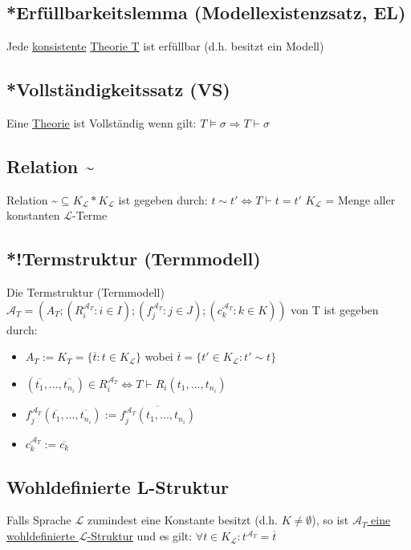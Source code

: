 \documentclass[12pt,a4paper]{article} %
\begin{document}
	\subsection{*Erfüllbarkeitslemma (Modellexistenzsatz, EL)}
	Jede \hyperref[PLKonsistent]{konsistente} \hyperref[Theorie]{Theorie T} ist erfüllbar (d.h. besitzt ein Modell)
	
	\subsection{*Vollständigkeitssatz (VS)}
	\label{TheorieVollstandig}
	Eine \hyperref[Theorie]{Theorie} ist Vollständig wenn gilt: $T \hyperref[Erfullbar]{\vDash} \sigma \Rightarrow T \hyperref[Beweisbar]{\vdash} \sigma$
	
	\subsection{Relation \textasciitilde}
	Relation \textasciitilde $\subseteq K_{\mathcal{L}} * K_{\mathcal{L}}$ ist gegeben durch: $ t \sim t' \Leftrightarrow T \hyperref[Beweisbar]{\vdash} t = t'$ \newline
	$K_{\mathcal{L}}$ = Menge aller konstanten $\mathcal{L}$-Terme 
	
	\subsection{*!Termstruktur (Termmodell)}
	Die Termstruktur (Termmodell) $\mathcal{A}_T = (A_T; (R_i^{\mathcal{A}_T}: i \in I); (f_j^{\mathcal{A}_T}: j \in J); (c_k^{\mathcal{A}_T}: k \in K))$ von T ist gegeben durch: 
	\begin{itemize}
		\item $A_T := K_T = \{\overline{t}: t \in K_{\mathcal{L}}\}$ wobei $\overline{t} = \{t' \in K_{\mathcal{L}}: t' \sim t\}$
		\item $(\overline{t_1}, ..., \overline{t_{n_i}}) \in R_i^{\mathcal{A}_T} \Leftrightarrow T \hyperref[Beweisbar]{\vdash} R_i(t_1, ..., t_{n_i})$
		\item $f_j^{\mathcal{A}_T}(\overline{t_1}, ..., \overline{t_{n_i}}) := \overline{f_j^{\mathcal{A}_T}(t_1, ..., t_{n_i})}$
		\item $c_k^{\mathcal{A}_T} := \overline{c_k}$
	\end{itemize}

	\subsection{Wohldefinierte L-Struktur}
	Falls Sprache $\mathcal{L}$ zumindest eine Konstante besitzt (d.h. $K \ne \emptyset$), so ist \hyperref[Struktur]{$\mathcal{A}_T$ eine wohldefinierte $\mathcal{L}$-Struktur} und es gilt: $\forall t \in K_{\mathcal{L}}: t^{\mathcal{A}_T} = \overline{t}$
	
\end{document}
